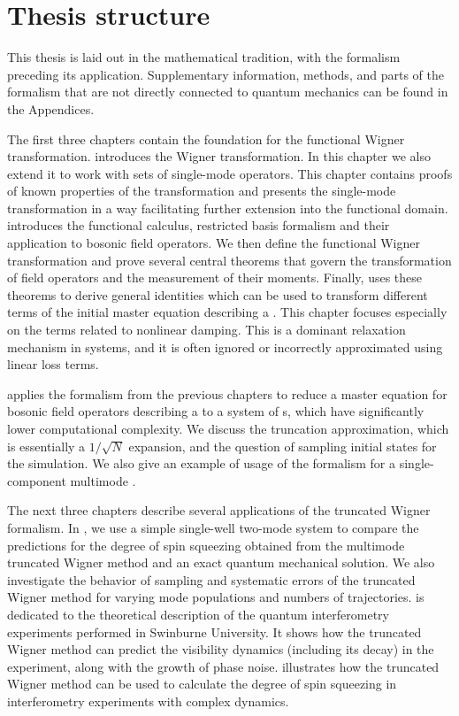 \section{Thesis structure}

This thesis is laid out in the mathematical tradition, with the formalism preceding its application.
Supplementary information, methods, and parts of the formalism that are not directly connected to quantum mechanics can be found in the Appendices.

The first three chapters contain the foundation for the functional Wigner transformation.
 introduces the Wigner transformation.
In this chapter we also extend it to work with sets of single-mode operators.
This chapter contains proofs of known properties of the transformation and presents the single-mode transformation in a way facilitating further extension into the functional domain.
 introduces the functional calculus, restricted basis formalism and their application to bosonic field operators.
We then define the functional Wigner transformation and prove several central theorems that govern the transformation of field operators and the measurement of their moments.
Finally,  uses these theorems to derive general identities which can be used to transform different terms of the initial master equation describing a .
This chapter focuses especially on the terms related to nonlinear damping.
This is a dominant relaxation mechanism in  systems, and it is often ignored or incorrectly approximated using linear loss terms.

 applies the formalism from the previous chapters to reduce a master equation for bosonic field operators describing a  to a system of s, which have significantly lower computational complexity.
We discuss the truncation approximation, which is essentially a $1/\sqrt{N}$ expansion, and the question of sampling initial states for the simulation.
We also give an example of usage of the formalism for a single-component multimode .

The next three chapters describe several applications of the truncated Wigner formalism.
In , we use a simple single-well two-mode system to compare the predictions for the degree of spin squeezing obtained from the multimode truncated Wigner method and an exact quantum mechanical solution.
We also investigate the behavior of sampling and systematic errors of the truncated Wigner method for varying mode populations and numbers of trajectories.
 is dedicated to the theoretical description of the quantum interferometry experiments performed in Swinburne University.
It shows how the truncated Wigner method can predict the visibility dynamics (including its decay) in the experiment, along with the growth of phase noise.
 illustrates how the truncated Wigner method can be used to calculate the degree of spin squeezing in interferometry experiments with complex dynamics.

